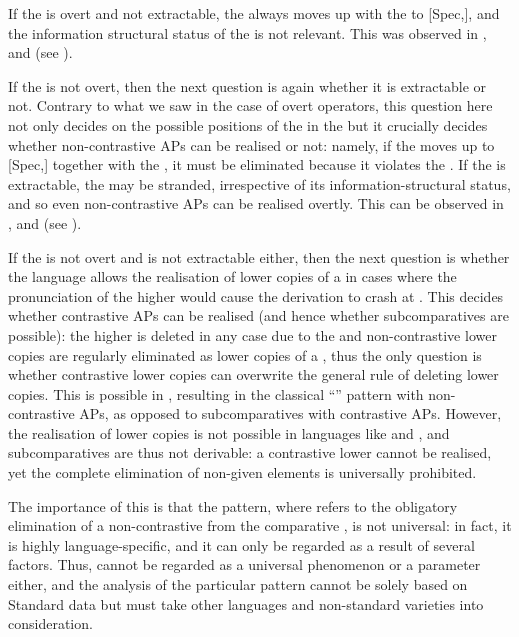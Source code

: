 If the  is overt and not extractable, the  always moves up with the  to [Spec,], and the information structural status of the  is not relevant. This was observed in ,  and  (see ).

If the  is not overt, then the next question is again whether it is extractable or not. Contrary to what we saw in the case of overt operators, this question here not only decides on the possible positions of the  in the  but it crucially decides whether non-contrastive APs can be realised or not: namely, if the  moves up to [Spec,] together with the , it must be eliminated because it violates the . If the  is extractable, the  may be stranded, irrespective of its information-structural status, and so even non-contrastive APs can be realised overtly. This can be observed in ,  and  (see ).

If the  is not overt and is not extractable either, then the next question is whether the language allows the realisation of lower copies of a  in cases where the pronunciation of the higher  would cause the derivation to crash at . This decides whether contrastive APs can be realised (and hence whether subcomparatives are possible): the higher  is deleted in any case due to the  and non-contrastive lower copies are regularly eliminated as lower copies of a , thus the only question is whether contrastive lower copies can overwrite the general rule of deleting lower copies. This is possible in , resulting in the classical ``'' pattern with non-contrastive APs, as opposed to subcomparatives with contrastive APs. However, the realisation of lower copies is not possible in languages like  and , and subcomparatives are thus not derivable: a contrastive lower  cannot be realised, yet the complete elimination of non-given elements is universally prohibited.

The importance of this is that the  pattern, where  refers to the obligatory elimination of a non-contrastive  from the comparative , is not universal: in fact, it is highly language-specific, and it can only be regarded as a result of several factors. Thus,  cannot be regarded as a universal phenomenon or a parameter either, and the analysis of the particular  pattern cannot be solely based on Standard  data but must take other languages and non-standard varieties into consideration.

